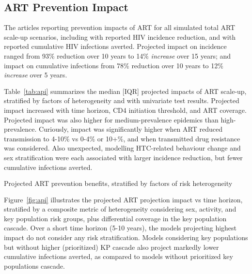 \subsection{ART Prevention Impact}
\label{ss:res:api}
The \ni articles reporting prevention impacts of ART for all
simulated  total ART scale-up scenarios, including
 with reported HIV incidence reduction, and
 with reported cumulative HIV infections averted.
Projected impact on incidence ranged from %
93\% reduction over 10 years\cite{Granich2009} to
14\% \emph{increase} over 15 years;\cite{Salomon2005}
and impact on cumulative infections from
78\% reduction over 10 years\cite{Abbas2006} to
12\% \emph{increase} over 5 years.\cite{Barnighausen2016}
\par %
Table~\ref{tab:api} summarizes the median [IQR] projected impacts of ART scale-up,
stratified by factors of heterogeneity and with univariate test results.
Projected impact increased with time horizon, CD4 initiation threshold, and ART coverage.
Projected impact was also higher for medium-prevalence epidemics than high-prevalence.
Curiously, impact was significantly higher when ART reduced transmission to 4-10\% vs 0-4\% or 10+\%,
and when transmitted drug resistance was considered.
Also unexpected, modelling HTC-related behaviour change and sex stratification
were each associated with larger incidence reduction, but fewer cumulative infections averted.
\begin{table}
  \caption{Projected ART prevention benefits,
    stratified by factors of risk heterogeneity}
  \centering
  
  \label{tab:api}
\end{table}
\par
Figure~\ref{fig:api} illustrates the projected ART projection impact vs time horizon,
stratified by a composite metric of heterogeneity considering
sex, activity, and key population risk groups, plus differential coverage in the key population cascade.
Over a short time horizon (5-10 years), the models projecting highest impact
do not consider any risk stratification.
Models considering key populations but without higher (prioritized) KP cascade also project
markedly lower cumulative infections averted, as compared to
models without prioritized key populations cascade.
